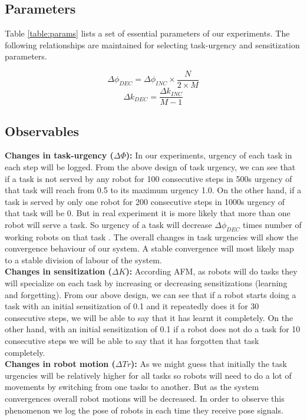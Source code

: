 \documentclass{llncs}
\begin{document}
\subsection{Parameters}
Table \ref{table:params} lists a set of essential parameters of our experiments. The following relationships are maintained for selecting task-urgency and sensitization parameters.
\begin{small}
\begin{equation}
\Delta\phi_{DEC} = \Delta\phi_{INC} \times \frac{N}{2 \times M}
\label{eqn:task-urgency}
\end{equation}
%
\begin{equation}
\Delta k_{DEC} = \frac{\Delta k_{INC}} {M - 1} 
\label{eqn:sensitization}
\end{equation}
\end{small}
%
\subsection{Observables}
\textbf{Changes in task-urgency ($\Delta \Phi$): }
In our experiments,  urgency of each task in each step will be logged. From the above design of task urgency, we can see that if a task is not served by any robot for 100 consecutive steps in 500s  urgency of that task will reach from 0.5 to its maximum urgency  1.0. On the other hand, if a task is served by only one robot for 200 consecutive steps in 1000s urgency of that task will be 0. But in real experiment it is more likely that more than one robot will serve a task. So urgency of a task will  decrease $\Delta\phi_{DEC}$ times number of working robots on that task \cite{Elsa}. The overall changes in task urgencies will show the convergence behaviour of our system. A stable convergence will most likely map to a stable division of labour of the system.\\
%
\textbf{Changes in sensitization ($\Delta K$): }
According AFM, as robots will do tasks they will specialize on each task by increasing or decreasing sensitizations (learning and forgetting).  From our above design, we can see that if a robot starts doing a task with an initial sensitization of 0.1 and it repeatedly does it for 30 consecutive steps, we will be able to say that it has learnt it completely. On the other hand,  with an initial sensitization of 0.1 if a robot does not do a task for 10 consecutive steps we will be able to say that it has forgotten that task completely.\\
%
\textbf{Changes in robot motion ($\Delta Tr$): }
As we might guess that initially the task urgencies will be relatively higher for all tasks so robots will need to do a lot of movements by switching from one tasks to another. But as the system convergences overall robot motions will be decreased. In order to observe this phenomenon we log the pose of robots in each time they receive pose signals.\\
\end{document}
